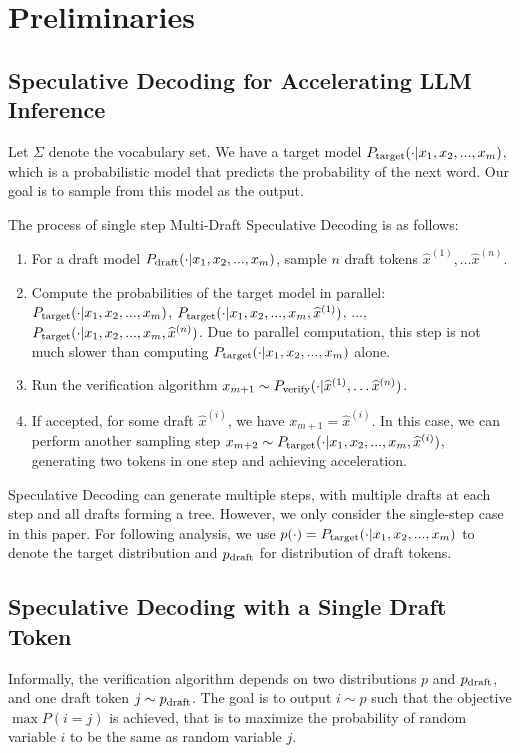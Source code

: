 \documentclass{article}
\makeatletter
\newcommand{\myvspace}{\@ifstar\myvspacestar\myvspacenostar}
\newcommand{\myvspacenostar}[1]{}
\newcommand{\myvspacestar}[1]{}
\newcommand{\crvspace}{\@ifstar\crvspacestar\crvspacenostar}
\newcommand{\crvspacenostar}[1]{}
\newcommand{\crvspacestar}[1]{}
\makeatother
\begin{document}
 \crvspace{-10pt}
\section{Preliminaries}\label{se:preliminary}
\crvspace{-10pt}
\subsection{Speculative Decoding for Accelerating LLM Inference}\label{sec:prelim_basic_sps}
\crvspace{-10pt}
Let $\Sigma$ denote the vocabulary set. We have a target model $P_{\operatorname{target}}(\cdot|x_1,x_2,...,x_m)$, which is a probabilistic model that predicts the probability of the next word. Our goal is to sample from this model as the output.

The process of single step Multi-Draft Speculative Decoding is as follows:
\begin{enumerate}[leftmargin=*,noitemsep=0mm,topsep=-2pt]
\item For a draft model $P_{\operatorname{draft}}(\cdot|x_1,x_2,...,x_m)$, sample $n$ draft tokens $\widehat{x}^{(1)},\dots\widehat{x}^{(n)}$.
\item Compute the probabilities of the target model in parallel:
$P_{\operatorname{target}}(\cdot|x_1,x_2,...,x_m)$, $P_{\operatorname{target}}(\cdot|x_1,x_2,...,x_m,\widehat{x}^{(1)})$, ..., $P_{\operatorname{target}}(\cdot|x_1,x_2,...,x_m,\widehat{x}^{(n)})$. Due to parallel computation, this step is not much slower than computing $P_{\operatorname{target}}(\cdot|x_1,x_2,...,x_m)$ alone.
\item Run the verification algorithm $x_{m+1}\sim P_{\operatorname{verify}}(\cdot|\widehat{x}^{(1)},\dots\widehat{x}^{(n)})$.
\item If accepted, for some draft $\widehat{x}^{(i)}$, we have $x_{m+1}=\widehat{x}^{(i)}$. In this case, we can perform another sampling step $x_{m+2}\sim P_{\operatorname{target}}(\cdot|x_1,x_2,...,x_m,\widehat{x}^{(i)})$, generating two tokens in one step and achieving acceleration.
\end{enumerate}

Speculative Decoding can generate multiple steps, with multiple drafts at each step and all drafts forming a tree. However, we only consider the single-step case in this paper. For following analysis, we use $p(\cdot)=P_{\operatorname{target}}(\cdot|x_1,x_2,...,x_m)$ to denote the target distribution and  $p_{\operatorname{draft}}$ for distribution of draft tokens.

\myvspace{-10pt}
\crvspace{-10pt}
\subsection{Speculative Decoding with a Single Draft Token}
\myvspace{-5pt}
\crvspace{-5pt}
Informally, the verification algorithm depends on two distributions $p$ and $p_{\operatorname{draft}}$, and one draft token $j\sim p_{\operatorname{draft}}$. The goal is to output $i\sim p$ such that the objective $\max P(i=j)$ is achieved, that is to maximize the probability of random variable $i$ to be the same as random variable $j$.
\end{document}
